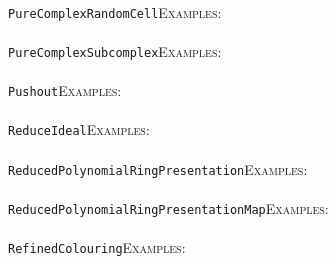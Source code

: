 \documentclass[a4paper,11pt]{report}
\begin{document}
{{ \\
 \texttt{PureComplexRandomCell}{\nobreakspace}{\nobreakspace}{\nobreakspace}{\nobreakspace}\textsc{Examples:} \\
 \\
 \texttt{PureComplexSubcomplex}{\nobreakspace}{\nobreakspace}{\nobreakspace}{\nobreakspace}\textsc{Examples:} \\
 \\
 \texttt{Pushout}{\nobreakspace}{\nobreakspace}{\nobreakspace}{\nobreakspace}\textsc{Examples:} \\
 \\
 \texttt{ReduceIdeal}{\nobreakspace}{\nobreakspace}{\nobreakspace}{\nobreakspace}\textsc{Examples:} \\
 \\
 \texttt{ReducedPolynomialRingPresentation}{\nobreakspace}{\nobreakspace}{\nobreakspace}{\nobreakspace}\textsc{Examples:} \\
 \\
 \texttt{ReducedPolynomialRingPresentationMap}{\nobreakspace}{\nobreakspace}{\nobreakspace}{\nobreakspace}\textsc{Examples:} \\
 \\
 \texttt{RefinedColouring}{\nobreakspace}{\nobreakspace}{\nobreakspace}{\nobreakspace}\textsc{Examples:} \\
 \\
}}
\end{document}
